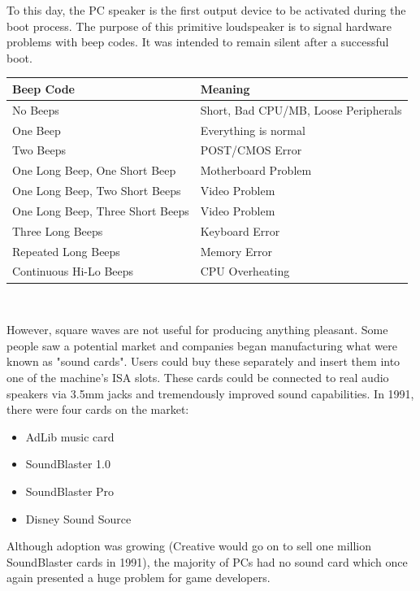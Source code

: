 \documentclass[book.tex]{subfiles}
\begin{document}
\par
 To this day, the PC speaker is the first output device to be activated during the boot process. The purpose of this primitive loudspeaker is to signal hardware problems with beep codes. It was intended to remain silent after a successful boot.\\
\par
\begin{tabularx}{\textwidth}{l l}
\textbf{Beep Code} & \textbf{Meaning}  \\ \hline
No Beeps                         & Short, Bad CPU/MB, Loose Peripherals \\ \hline
One Beep                         & Everything is normal\\ \hline
Two Beeps                        & POST/CMOS Error \\ \hline 
One Long Beep, One Short Beep    & Motherboard Problem \\ \hline
One Long Beep, Two Short Beeps   & Video Problem \\ \hline
One Long Beep, Three Short Beeps & Video Problem \\ \hline
Three Long Beeps                 & Keyboard Error \\ \hline
Repeated Long Beeps              & Memory Error \\ \hline
Continuous Hi-Lo Beeps           & CPU Overheating \\ \hline
\end{tabularx}\\
\bigskip
\par
However, square waves are not useful for producing anything pleasant. Some people saw a potential market and companies began manufacturing what were known as "sound cards". Users could buy these separately and insert them into one of the machine's ISA slots. These cards could be connected to real audio speakers via 3.5mm jacks and tremendously improved sound capabilities. In 1991, there were four cards on the market:\\
\par
\begin{itemize}
\item AdLib music card
\item SoundBlaster 1.0
\item SoundBlaster Pro
\item Disney Sound Source
\end{itemize}
\par
Although adoption was growing (Creative would go on to sell one million SoundBlaster cards in 1991), the majority of PCs had no sound card which once again presented a huge problem for game developers.
\end{document}
